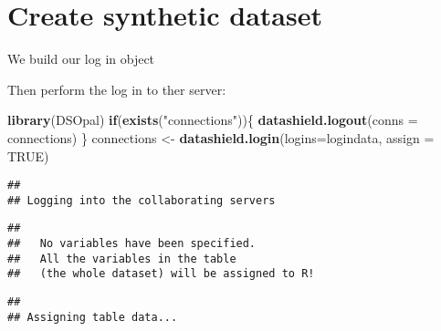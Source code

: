 \documentclass[
]{book}
\newenvironment{Shaded}{\begin{snugshade}}{\end{snugshade}}
\newcommand{\ControlFlowTok}[1]{\textcolor[rgb]{0.13,0.29,0.53}{\textbf{#1}}}
\newcommand{\DataTypeTok}[1]{\textcolor[rgb]{0.13,0.29,0.53}{#1}}
\newcommand{\KeywordTok}[1]{\textcolor[rgb]{0.13,0.29,0.53}{\textbf{#1}}}
\newcommand{\NormalTok}[1]{#1}
\newcommand{\OperatorTok}[1]{\textcolor[rgb]{0.81,0.36,0.00}{\textbf{#1}}}
\newcommand{\OtherTok}[1]{\textcolor[rgb]{0.56,0.35,0.01}{#1}}
\newcommand{\StringTok}[1]{\textcolor[rgb]{0.31,0.60,0.02}{#1}}
\begin{document}
\hypertarget{create-synthetic-dataset}{%
\section{Create synthetic dataset}\label{create-synthetic-dataset}}

We build our log in object

\begin{Shaded}
\end{Shaded}

Then perform the log in to ther server:

\begin{Shaded}
\begin{Highlighting}[]
\KeywordTok{library}\NormalTok{(DSOpal)}
\ControlFlowTok{if}\NormalTok{(}\KeywordTok{exists}\NormalTok{(}\StringTok{"connections"}\NormalTok{))\{}
  \KeywordTok{datashield.logout}\NormalTok{(}\DataTypeTok{conns =}\NormalTok{ connections)}
\NormalTok{\}}
\NormalTok{connections <-}\StringTok{ }\KeywordTok{datashield.login}\NormalTok{(}\DataTypeTok{logins=}\NormalTok{logindata, }\DataTypeTok{assign =} \OtherTok{TRUE}\NormalTok{)}
\end{Highlighting}
\end{Shaded}

\begin{verbatim}
## 
## Logging into the collaborating servers
\end{verbatim}

\begin{verbatim}
## 
##   No variables have been specified. 
##   All the variables in the table 
##   (the whole dataset) will be assigned to R!
\end{verbatim}

\begin{verbatim}
## 
## Assigning table data...
\end{verbatim}
\end{document}
